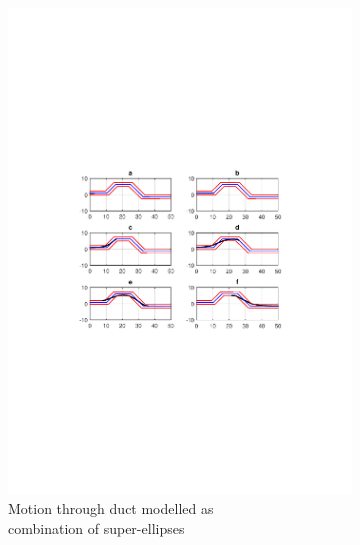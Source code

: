 \documentclass[12pt,a4]{article}
\begin{document}
\begin{figure}[ht!]
    \centering
    \begin{subfigure}{0.48\textwidth}
        \centering
        \includegraphics[width=0.95\linewidth]{figures/fig5.pdf}
        \caption{Motion through duct modelled as \\combination of super-ellipses \label{fig:ductasSEs}}
    \end{subfigure}%
    \begin{subfigure}{0.48\textwidth}
        \centering

\end{subfigure}
\end{figure}
\end{document}
